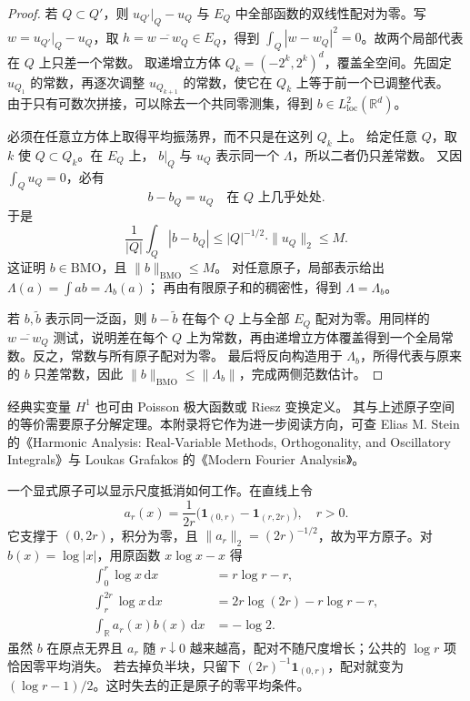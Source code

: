 \begin{proof}
若 \(Q\subset Q'\)，则 \(u_{Q'}|_Q-u_Q\) 与 \(E_Q\) 中全部函数的双线性配对为零。写
\(w=u_{Q'}|_Q-u_Q\)，取
\(h=\overline{w-w_Q}\in E_Q\)，得到
\(\int_Q|w-w_Q|^2=0\)。故两个局部代表在 \(Q\) 上只差一个常数。
取递增立方体
\(Q_k=(-2^k,2^k)^d\)，覆盖全空间。先固定 \(u_{Q_1}\) 的常数，再逐次调整
\(u_{Q_{k+1}}\) 的常数，使它在 \(Q_k\) 上等于前一个已调整代表。
由于只有可数次拼接，可以除去一个共同零测集，得到
\(b\in L^2_{\mathrm{loc}}(\mathbb R^d)\)。

必须在任意立方体上取得平均振荡界，而不只是在这列 \(Q_k\) 上。
给定任意 \(Q\)，取 \(k\) 使 \(Q\subset Q_k\)。在 \(E_Q\) 上，
\(b|_Q\) 与 \(u_Q\) 表示同一个 \(\Lambda\)，所以二者仍只差常数。
又因 \(\int_Qu_Q=0\)，必有
\[
 b-b_Q=u_Q\quad\text{在 }Q\text{ 上几乎处处}.
\]
于是
\[
 \frac1{|Q|}\int_Q|b-b_Q|
 \le |Q|^{-1/2}\cdot\|u_Q\|_2\le M.
\]
这证明 \(b\in\mathrm{BMO}\)，且 \(\|b\|_{\mathrm{BMO}}\le M\)。
对任意原子，局部表示给出 \(\Lambda(a)=\int ab=\Lambda_b(a)\)；
再由有限原子和的稠密性，得到 \(\Lambda=\Lambda_b\)。

若 \(b,\widetilde b\) 表示同一泛函，则 \(b-\widetilde b\) 在每个
\(Q\) 上与全部 \(E_Q\) 配对为零。用同样的
\(\overline{w-w_Q}\) 测试，说明差在每个 \(Q\) 上为常数，再由递增立方体覆盖得到一个全局常数。反之，常数与所有原子配对为零。
最后将反向构造用于 \(\Lambda_b\)，所得代表与原来的 \(b\) 只差常数，因此
\(\|b\|_{\mathrm{BMO}}\le\|\Lambda_b\|\)，完成两侧范数估计。
\end{proof}

经典实变量 \(H^1\) 也可由 Poisson 极大函数或 Riesz 变换定义。
其与上述原子空间的等价需要原子分解定理。本附录将它作为进一步阅读方向，可查
Elias M. Stein 的《Harmonic Analysis: Real-Variable Methods, Orthogonality, and Oscillatory Integrals》\cite{Stein1993Harmonic}与
Loukas Grafakos 的《Modern Fourier Analysis》\cite{Grafakos2014Modern}。

\ProseParagraphBreak

一个显式原子可以显示尺度抵消如何工作。在直线上令
\[
 a_r(x)=\frac1{2r}
       \bigl(\mathbf1_{(0,r)}-\mathbf1_{(r,2r)}\bigr),
 \quad r>0.
\]
它支撑于 \((0,2r)\)，积分为零，且
\(\|a_r\|_2=(2r)^{-1/2}\)，故为平方原子。对
\(b(x)=\log|x|\)，用原函数 \(x\log x-x\) 得
\[
\begin{aligned}
 \int_0^r\log x\,\mathrm dx&=r\log r-r,\\
 \int_r^{2r}\log x\,\mathrm dx
 &=2r\log(2r)-r\log r-r,\\
 \int_{\mathbb R}a_r(x)b(x)\,\mathrm dx&=-\log2.
\end{aligned}
\]
虽然 \(b\) 在原点无界且 \(a_r\) 随 \(r\downarrow0\) 越来越高，配对不随尺度增长；公共的 \(\log r\) 项恰因零平均消失。
若去掉负半块，只留下 \((2r)^{-1}\mathbf1_{(0,r)}\)，配对就变为
\((\log r-1)/2\)。这时失去的正是原子的零平均条件。


